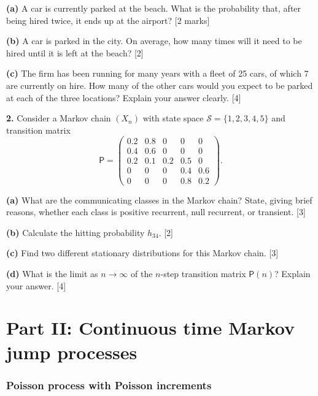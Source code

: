 \documentclass[
  a4paper,
]{article}
\theoremstyle{definition}
\theoremstyle{definition}
\theoremstyle{definition}
\theoremstyle{remark}
\begin{document}
\textbf{(a)} A car is currently parked at the beach. What is the probability that, after being hired twice, it ends up at the airport? {{[}2 marks{]}}

\textbf{(b)} A car is parked in the city. On average, how many times will it need to be hired until it is left at the beach? {{[}2{]}}

\textbf{(c)} The firm has been running for many years with a fleet of 25 cars, of which 7 are currently on hire. How many of the other cars would you expect to be parked at each of the three locations? Explain your answer clearly. {{[}4{]}}

\textbf{2.} Consider a Markov chain \((X_n)\) with state space \(\mathcal S = \{1,2,3,4,5\}\) and transition matrix
\[ \mathsf P = \begin{pmatrix} 0.2 & 0.8 & 0   & 0   & 0   \\
                               0.4 & 0.6 & 0   & 0   & 0   \\
                               0.2 & 0.1 & 0.2 & 0.5 & 0   \\
                               0   & 0   & 0   & 0.4 & 0.6 \\
                               0   & 0   & 0   & 0.8 & 0.2 \end{pmatrix}. \]

\textbf{(a)} What are the communicating classes in the Markov chain? State, giving brief reasons, whether each class is positive recurrent, null recurrent, or transient. {{[}3{]}}

\textbf{(b)} Calculate the hitting probability \(h_{34}\). {{[}2{]}}

\textbf{(c)} Find two different stationary distributions for this Markov chain. {{[}3{]}}

\textbf{(d)} What is the limit as \(n \to \infty\) of the \(n\)-step transition matrix \(\mathsf P(n)\)? Explain your answer. {{[}4{]}}

\hypertarget{part-part-ii-continuous-time-markov-jump-processes}{%
\part*{Part II: Continuous time Markov jump processes}\label{part-part-ii-continuous-time-markov-jump-processes}}

\hypertarget{S13-poisson-poisson}{%
\section{Poisson process with Poisson increments}\label{S13-poisson-poisson}}
\end{document}

